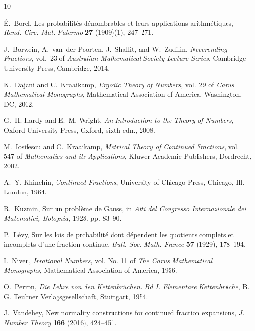 \documentclass[10pt]{article}
\theoremstyle{definition}
\numberwithin{equation}{section}
\numberwithin{lemma}{section}
\begin{document}
\begin{thebibliography}{10}\footnotesize

{\'E}.~Borel, Les probabilit{\'e}s d{\'e}nombrables et leurs applications
  arithm{\'e}tiques, \textit{Rend. Circ. Mat. Palermo} \textbf{27} (1909)(1),
  247--271.

J.~Borwein, A.~van~der Poorten, J.~Shallit, and W.~Zudilin, \textit{Neverending
  Fractions}, vol.~23 of \textit{Australian Mathematical Society Lecture
  Series}, Cambridge University Press, Cambridge, 2014.

K.~Dajani and C.~Kraaikamp, \textit{Ergodic Theory of Numbers}, vol.~29 of
  \textit{Carus Mathematical Monographs}, Mathematical Association of America,
  Washington, DC, 2002.

G.~H. Hardy and E.~M. Wright, \textit{An Introduction to the Theory of
  Numbers}, Oxford University Press, Oxford, sixth edn., 2008.

M.~Iosifescu and C.~Kraaikamp, \textit{Metrical Theory of Continued Fractions},
  vol. 547 of \textit{Mathematics and its Applications}, Kluwer Academic
  Publishers, Dordrecht, 2002.

A.~Y. Khinchin, \textit{Continued Fractions}, University of Chicago Press,
  Chicago, Ill.-London, 1964.

R.~Kuzmin, Sur un probl{\`e}me de {G}auss, in \textit{Atti del Congresso
  Internazionale dei Matematici, Bolognia}, 1928, pp. 83--90.

P.~L{\'e}vy, Sur les lois de probabilit{\'e} dont d{\'e}pendent les quotients
  complets et incomplets d'une fraction continue, \textit{Bull. Soc. Math.
  France} \textbf{57} (1929), 178--194.

I.~Niven, \textit{Irrational Numbers}, vol. No. 11 of \textit{The Carus
  Mathematical Monographs}, Mathematical Association of America, 1956.

O.~Perron, \textit{Die {L}ehre von den {K}ettenbr\"uchen. {B}d {I}.
  {E}lementare {K}ettenbr\"uche}, B. G. Teubner Verlagsgesellschaft, Stuttgart,
  1954.

J.~Vandehey, New normality constructions for continued fraction expansions,
  \textit{J. Number Theory} \textbf{166} (2016), 424--451.

\end{thebibliography}
\end{document}
